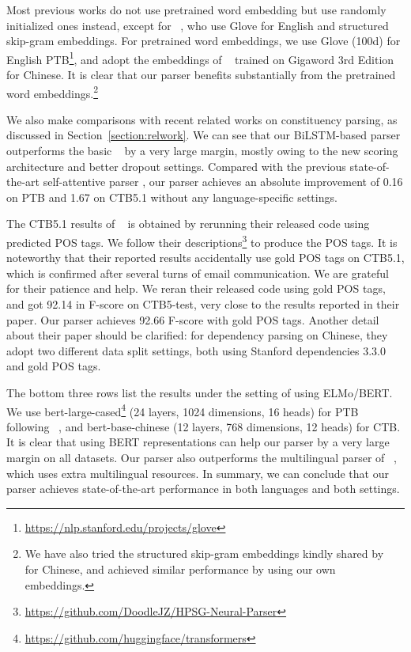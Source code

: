 \documentclass{article}
\begin{document}
Most previous works do not use pretrained word embedding but use randomly initialized ones instead, except for \citeauthor{zhou-zhao-2019-head}~, who use Glove for English and structured skip-gram embeddings.
For pretrained word embeddings, we use Glove (100d) for English PTB\footnote{\url{https://nlp.stanford.edu/projects/glove}},
and adopt the embeddings of \citeauthor{li-etal-2019-attentive}~ trained on Gigaword 3rd Edition for Chinese.
It is clear that our parser benefits substantially from the pretrained word embeddings.\footnote{
We have also tried the structured skip-gram embeddings kindly shared by \citeauthor{zhou-zhao-2019-head}~ for Chinese, and achieved similar performance by using our own embeddings.
}

We also make comparisons with recent related works on constituency parsing, as discussed in Section~\ref{section:relwork}.
We can see that our BiLSTM-based parser outperforms the basic \citeauthor{stern-etal-2017-minimal}~ by a very large margin, mostly owing to the new scoring architecture and better dropout settings.
Compared with the previous state-of-the-art self-attentive parser \cite{kitaev-klein-2018-constituency},
our parser achieves an absolute improvement of 0.16 on PTB and 1.67 on CTB5.1 without any language-specific settings.





The CTB5.1 results of \citeauthor{zhou-zhao-2019-head}~ is obtained by rerunning their released code using predicted POS tags.
We follow their descriptions\footnote{\url{https://github.com/DoodleJZ/HPSG-Neural-Parser}} to produce the POS tags.
It is noteworthy that their reported results accidentally use gold POS tags on CTB5.1, which is confirmed after several turns of email communication. We are grateful for their patience and help.
We reran their released code using gold POS tags, and got 92.14 in F-score on CTB5-test, very close to the results reported in their paper.
Our parser achieves 92.66 F-score with gold POS tags.
Another detail about their paper should be clarified: for dependency parsing on Chinese, they adopt two different data split settings, both using Stanford dependencies 3.3.0 and gold POS tags.

The bottom three rows list the results under the setting of using ELMo/BERT.
We use bert-large-cased\footnote{\url{https://github.com/huggingface/transformers}} (24 layers, 1024 dimensions, 16 heads) for PTB following \citeauthor{kitaev-etal-2019-multilingual}~, and bert-base-chinese (12 layers, 768 dimensions, 12 heads) for CTB.
It is clear that using BERT representations can help our parser by a very large margin on all datasets. Our parser also outperforms the multilingual parser of \citeauthor{kitaev-etal-2019-multilingual}~, which uses extra multilingual resources.
In summary, we can conclude that our parser achieves state-of-the-art performance in both languages and both settings.
\end{document}
